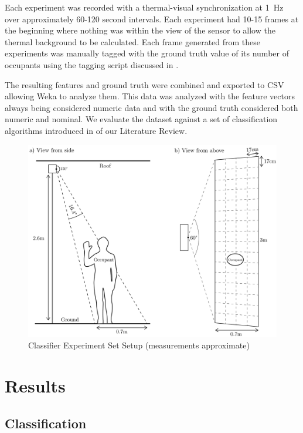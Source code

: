 \documentclass[../thesis/thesis.tex]{subfiles}
\begin{document}
Each experiment was recorded with a thermal-visual synchronization at 1~Hz over approximately 60-120 second intervals. Each experiment had 10-15 frames at the beginning where nothing was within the view of the sensor to allow the thermal background to be calculated. Each frame generated from these experiments was manually tagged with the ground truth value of its number of occupants using the tagging script discussed in .

The resulting features and ground truth were combined and exported to CSV allowing Weka to analyze them. This data was analyzed with the feature vectors always being considered numeric data and with the ground truth considered both numeric and nominal. We evaluate the dataset against a set of classification algorithms introduced in  of our Literature Review.

\begin{landscape}
 \begin{figure}
 \centering
 \includegraphics[height=\textheight]{../diagrams/third-exp-setup2.pdf}
 \caption{Classifier Experiment Set Setup (measurements approximate)}
 \label{fig:exps:3setup}
 \end{figure}
\end{landscape}

\section{Results}
\label{sec:results}

\subsection{Classification}
\label{subsec:classification}
\end{document}
